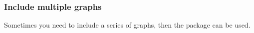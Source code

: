 \documentclass{beamer}
\begin{document}
\begin{frame}
	\frametitle{Include multiple graphs}
	Sometimes you need to include a series of graphs, then the  package can be used.\\
	\begin{minipage}{0.4\linewidth}
		\begin{example}
			\begin{figure}[htbp]
				\centering
\end{figure}
\end{example}
\end{minipage}
\end{frame}
\end{document}
